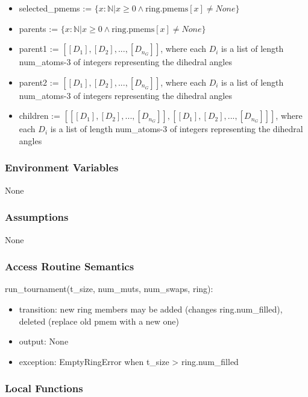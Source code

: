 \documentclass[12pt, titlepage]{article}
\begin{document}
\begin{itemize}
\item selected\_pmems := $\{x : \mathbb{N} | x \geq 0 \land 
\text{ring.pmems}[x] \neq None\}$
\item parents := $\{x : \mathbb{N} | x \geq 0 \land \text{ring.pmems}[x] \neq 
None\}$
\item parent1 := $[[D_1], [D_2], ..., [D_{n_G}]]$, where each 
$D_i$ is a list of length num\_atoms-3 of integers representing the dihedral 
angles
\item parent2 := $[[D_1], [D_2], ..., [D_{n_G}]]$, where each 
$D_i$ is a list of length num\_atoms-3 of integers representing the dihedral 
angles
\item children := $[[[D_1], [D_2], ..., [D_{n_G}]], [[D_1], [D_2], ..., 
[D_{n_G}]]]$, where each $D_i$ is a list of length num\_atoms-3 of integers 
representing the dihedral 
angles
\end{itemize}


\subsubsection{Environment Variables}

None

\subsubsection{Assumptions}

None 

\subsubsection{Access Routine Semantics}

\noindent run\_tournament(t\_size, num\_muts, num\_swaps, ring):
\begin{itemize}
	\item transition: new ring members may be added (changes ring.num\_filled), 
	deleted (replace old pmem with a new one)
	\item output: None 
	\item exception: EmptyRingError when t\_size > ring.num\_filled
\end{itemize}

\subsubsection{Local Functions}
\end{document}
